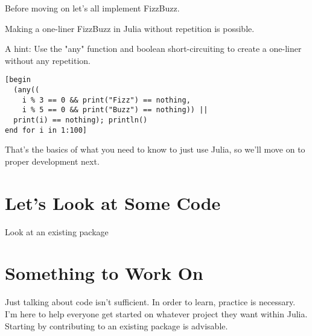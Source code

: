 \documentclass{article}
\begin{document}
Before moving on let's all implement FizzBuzz.

Making a one-liner FizzBuzz in Julia without repetition is possible.

A hint:
Use the "any" function and boolean short-circuiting to create a one-liner
without any repetition.

\begin{verbatim}
[begin 
  (any((
    i % 3 == 0 && print("Fizz") == nothing, 
    i % 5 == 0 && print("Buzz") == nothing)) || 
  print(i) == nothing); println()
end for i in 1:100]
\end{verbatim}

That's the basics of what you need to know to just use Julia, so we'll move
on to proper development next.

\section{Let's Look at Some Code}

Look at an existing package 

\section{Something to Work On}

Just talking about code isn't sufficient. In order to learn, practice is 
necessary. I'm here to help everyone get started on whatever project they
want within Julia. Starting by contributing to an existing package is
advisable.
\end{document}
